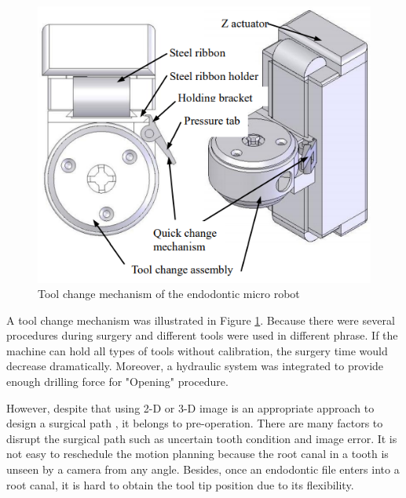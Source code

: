 \begin{figure}[htbp]
\begin{center}
\includegraphics[width=0.6\linewidth]{Images/NCTU_3.png}
\caption[Tool change mechanism of the endodontic micro robot]{
Tool change mechanism of the endodontic micro robot \cite{dong2010design}
}\label{fig:NCTU_3}
\end{center}
\end{figure}
\par
A tool change mechanism was illustrated in Figure \ref{fig:NCTU_3}. Because there were several procedures during surgery and different tools were used in different phrase. If the machine can hold all types of tools without calibration, the surgery time would decrease dramatically.  Moreover, a hydraulic system was integrated to provide enough drilling force for "Opening" procedure.
\par
However, despite that using 2-D or 3-D image is an appropriate approach to design a surgical path \cite{5334530,7806263} , it belongs to pre-operation. There are many factors to disrupt the surgical path such as uncertain tooth condition and image error. It is not easy to reschedule the motion planning because the root canal in a tooth is unseen by a camera from any angle. Besides, once an endodontic file enters into a root canal, it is hard to obtain the tool tip position due to its flexibility. 
